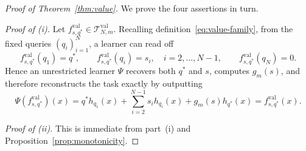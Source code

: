 \documentclass{article}
\begin{document}
\begin{proof}[Proof of Theorem~\ref{thm:value}]
We prove the four assertions in turn.

\medskip
\noindent
\emph{Proof of (i).}
Let $f^{\mathrm{val}}_{s,q^\ast}\in \mathcal{T}_{N,m}^{\mathrm{val}}$.
Recalling definition~\eqref{eq:value-family}, from the fixed queries $(q_i)_{i=1}^N$, a learner can read off
\[
f^{\mathrm{val}}_{s,q^\ast}(q_1)=q^\ast,
\qquad
f^{\mathrm{val}}_{s,q^\ast}(q_i)=s_i,\quad i=2,\dots,N-1,
\qquad
f^{\mathrm{val}}_{s,q^\ast}(q_N)=0.
\]
Hence an unrestricted learner $\Psi$ recovers both $q^\ast$ and $s$, computes $g_m(s)$, and therefore
reconstructs the task exactly by outputting
\[
\Psi(f^{\mathrm{val}}_{s,q^\ast})(x)
=
q^\ast h_{q_1}(x)+\sum_{i=2}^{N-1} s_i h_{q_i}(x)+g_m(s)h_{q^\ast}(x) = f^{\mathrm{val}}_{s,q^\ast}(x). 
\]



\medskip
\noindent
\emph{Proof of (ii).}
This is immediate from part~(i) and Proposition~\ref{prop:monotonicity}. 



\end{proof}
\end{document}
